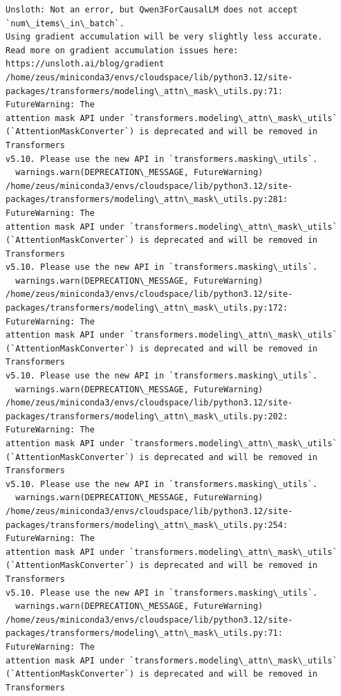 \documentclass[11pt]{article}
\begin{document}
    
    \begin{Verbatim}[commandchars=\\\{\}]
Unsloth: Not an error, but Qwen3ForCausalLM does not accept
`num\_items\_in\_batch`.
Using gradient accumulation will be very slightly less accurate.
Read more on gradient accumulation issues here: https://unsloth.ai/blog/gradient
/home/zeus/miniconda3/envs/cloudspace/lib/python3.12/site-
packages/transformers/modeling\_attn\_mask\_utils.py:71: FutureWarning: The
attention mask API under `transformers.modeling\_attn\_mask\_utils`
(`AttentionMaskConverter`) is deprecated and will be removed in Transformers
v5.10. Please use the new API in `transformers.masking\_utils`.
  warnings.warn(DEPRECATION\_MESSAGE, FutureWarning)
/home/zeus/miniconda3/envs/cloudspace/lib/python3.12/site-
packages/transformers/modeling\_attn\_mask\_utils.py:281: FutureWarning: The
attention mask API under `transformers.modeling\_attn\_mask\_utils`
(`AttentionMaskConverter`) is deprecated and will be removed in Transformers
v5.10. Please use the new API in `transformers.masking\_utils`.
  warnings.warn(DEPRECATION\_MESSAGE, FutureWarning)
/home/zeus/miniconda3/envs/cloudspace/lib/python3.12/site-
packages/transformers/modeling\_attn\_mask\_utils.py:172: FutureWarning: The
attention mask API under `transformers.modeling\_attn\_mask\_utils`
(`AttentionMaskConverter`) is deprecated and will be removed in Transformers
v5.10. Please use the new API in `transformers.masking\_utils`.
  warnings.warn(DEPRECATION\_MESSAGE, FutureWarning)
/home/zeus/miniconda3/envs/cloudspace/lib/python3.12/site-
packages/transformers/modeling\_attn\_mask\_utils.py:202: FutureWarning: The
attention mask API under `transformers.modeling\_attn\_mask\_utils`
(`AttentionMaskConverter`) is deprecated and will be removed in Transformers
v5.10. Please use the new API in `transformers.masking\_utils`.
  warnings.warn(DEPRECATION\_MESSAGE, FutureWarning)
/home/zeus/miniconda3/envs/cloudspace/lib/python3.12/site-
packages/transformers/modeling\_attn\_mask\_utils.py:254: FutureWarning: The
attention mask API under `transformers.modeling\_attn\_mask\_utils`
(`AttentionMaskConverter`) is deprecated and will be removed in Transformers
v5.10. Please use the new API in `transformers.masking\_utils`.
  warnings.warn(DEPRECATION\_MESSAGE, FutureWarning)
/home/zeus/miniconda3/envs/cloudspace/lib/python3.12/site-
packages/transformers/modeling\_attn\_mask\_utils.py:71: FutureWarning: The
attention mask API under `transformers.modeling\_attn\_mask\_utils`
(`AttentionMaskConverter`) is deprecated and will be removed in Transformers

\end{Verbatim}
\end{document}
